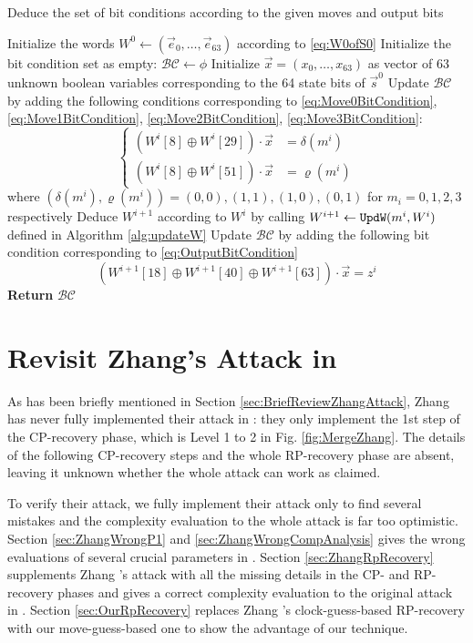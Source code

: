 \begin{algorithm}[htbp]
	\caption{Deduce the set of bit conditions according to the given moves and output bits} \label{alg:getBC}
	\begin{algorithmic}[1]
\State Initialize the words $W^0\leftarrow (\vec e_0,\ldots, \vec e_{63})$ according to \eqref{eq:W0ofS0}
\State Initialize the bit condition set as empty: $\mathcal{BC}\leftarrow \phi$
\State Initialize $\vec{x}=(x_0,\ldots, x_{63})$ as vector of 63 unknown boolean variables corresponding to the 64 state bits of $\vec s^0$
\State Update $\mathcal{BC}$ by adding the following conditions corresponding to \eqref{eq:Move0BitCondition}, \eqref{eq:Move1BitCondition}, \eqref{eq:Move2BitCondition}, \eqref{eq:Move3BitCondition}:
\[
\left\{
\begin{aligned}
(W^i[8]\oplus W^i[29])\cdot \vec x&=\delta(m^i)\\
(W^i[8]\oplus W^i[51])\cdot \vec x&=\varrho(m^i)
\end{aligned}
\right.
\]
where $(\delta(m^i), \varrho(m^i))=(0,0),(1,1),(1,0),(0,1)$ for $m_i=0,1,2,3$ respectively
\EndIf
\State Deduce $W^{i+1}$ according to $W^{i}$ by calling $W^{i+1}\leftarrow {\tt UpdW}(m^i,W^i)$ defined in Algorithm \ref{alg:updateW}
\State Update $\mathcal{BC}$ by adding the following bit condition corresponding to \eqref{eq:OutputBitCondition}
\[
(W^{i+1}[18]\oplus W^{i+1}[40]\oplus W^{i+1}[63])\cdot \vec x =z^i
\]
\EndFor
\State \textbf{Return} $\mathcal{BC}$
		\EndProcedure
	\end{algorithmic}
\end{algorithm}


\section{Revisit Zhang's Attack in \cite{AC:Zhang19}}
As has been briefly mentioned in Section \ref{sec:BriefReviewZhangAttack}, Zhang \etal has never fully implemented their attack in \cite{AC:Zhang19}:
they only implement the 1st step of the CP-recovery phase, which is Level 1 to 2 in Fig. \ref{fig:MergeZhang}.
The details of the following CP-recovery steps and the whole RP-recovery phase are absent, leaving it unknown whether the whole attack can work as claimed.

To verify their attack, we fully implement their attack only to find several mistakes and the complexity evaluation to the whole attack is far too optimistic.
Section \ref{sec:ZhangWrongP1} and \ref{sec:ZhangWrongCompAnalysis} gives the wrong evaluations of several crucial parameters in \cite{AC:Zhang19}.
Section \ref{sec:ZhangRpRecovery} supplements Zhang \etal's attack with all the missing details in the CP- and RP-recovery phases and gives a correct complexity evaluation to the original attack in \cite{AC:Zhang19}.
Section \ref{sec:OurRpRecovery} replaces Zhang \etal's clock-guess-based RP-recovery with our move-guess-based one to show the advantage of our technique.

